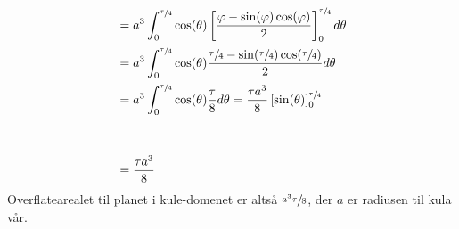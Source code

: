\documentclass{../../myassignment}
\begin{document}
\begin{answer}
\begin{align*}
				&= a^3 \int_0^{\sfrac{\tau}{4}} \cos(\theta) \left[ \frac{\varphi-\sin(\varphi)\cos(\varphi)}{2} \right]_0^{\sfrac{\tau}{4}}  d\theta \\
				&= a^3 \int_0^{\sfrac{\tau}{4}} \cos(\theta) \frac{{\sfrac{\tau}{4}}-\sin({\sfrac{\tau}{4}})\cos({\sfrac{\tau}{4}})}{2}  d\theta \\
				&= a^3 \int_0^{\sfrac{\tau}{4}} \cos(\theta) \frac{\tau}{8}  d\theta =
				 \frac{\tau a^3}{8}  \left[ \sin(\theta) \right]_0^{\sfrac{\tau}{4}} \\[1cm]
				&= \frac{\tau a^3}{8}
		\end{align*}
		Overflatearealet til planet i kule-domenet er altså $\sfrac{a^3\tau}{8}$, der $a$ er radiusen til kula vår.

	\end{answer}
\end{document}
